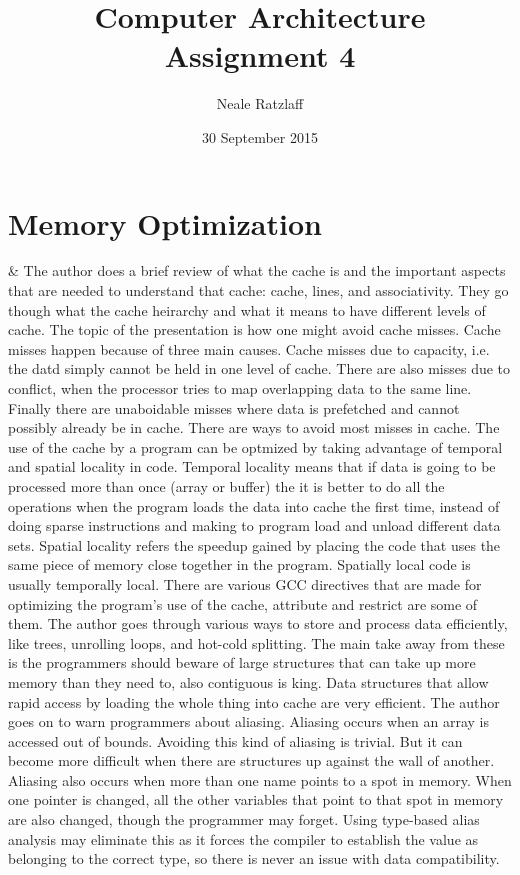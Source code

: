 \documentclass[letterpaper,10pt,titlepage]{article}
\title{Computer Architecture Assignment 4}
\author{Neale Ratzlaff}
\date{30 September 2015}
\begin{document}
\maketitle
\pagebreak
\section{Memory Optimization}
    & The author does a brief review of what the cache is and the important aspects that are needed to understand that cache: 
    cache, lines, and associativity. They go though what the cache heirarchy and what it means to have different levels of cache. 
    The topic of the presentation is how one might avoid cache misses. Cache misses happen because of three main causes. Cache misses 
    due to capacity, i.e. the datd simply cannot be held in one level of cache. There are also misses due to conflict, when the processor tries 
    to map overlapping data to the same line. Finally there are unaboidable misses where data is prefetched and cannot possibly already 
    be in cache. There are ways to avoid most misses in cache. The use of the cache by a program can be optmized by taking advantage of temporal 
    and spatial locality in code. Temporal locality means that if data is going to be processed more than once (array or buffer) the it is better 
    to do all the operations when the program loads the data into cache the first time, instead of doing sparse instructions and making to program 
    load and unload different data sets. Spatial locality refers the speedup gained by placing the code that uses the same piece of memory close 
    together in the program. Spatially local code is usually temporally local. There are various GCC directives that are made for optimizing the 
    program's use of the cache, attribute and restrict are some of them. The author goes through various ways to store and process data 
    efficiently, like trees, unrolling loops, and hot-cold splitting. The main take away from these is the programmers should beware of 
    large structures that can take up more memory than they need to, also contiguous is king. Data structures that allow rapid access by loading 
    the whole thing into cache are very efficient. The author goes on to warn programmers about aliasing. Aliasing occurs when an array is accessed 
    out of bounds. Avoiding this kind of aliasing is trivial. But it can become more difficult when there are structures up against the wall of 
    another. Aliasing also occurs when more than one name points to a spot in memory. When one pointer is changed, all the other variables that 
    point to that spot in memory are also changed, though the programmer may forget. Using type-based alias analysis may eliminate this as 
    it forces the compiler to establish the value as belonging to the correct type, so there is never an issue with data compatibility. 
\end{document}
